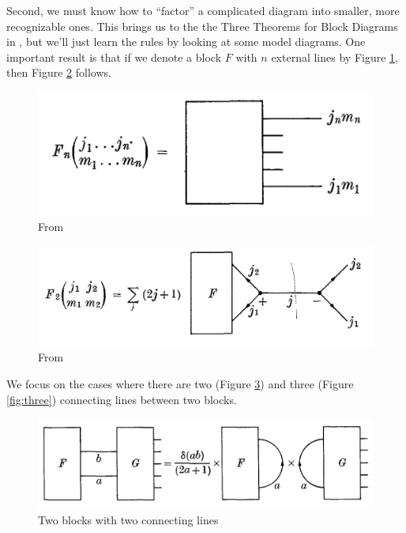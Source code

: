 \documentclass[11pt]{article}
\begin{document}
\begin{appendices}
Second, we must know how to ``factor'' a complicated diagram into smaller, more recognizable ones. This brings us to the the Three Theorems for Block Diagrams in \cite{angular_momentum}, but we'll just learn the rules by looking at some model diagrams. One important result is that if we denote a block $F$ with $n$ external lines by Figure \ref{fig:block0}, then Figure \ref{fig:block1} follows.
\begin{figure}[!htb]
	\centering
	\includegraphics[scale=0.7]{block0}
	\caption{From \cite{angular_momentum}}
	\label{fig:block0}
\end{figure}
\begin{figure}[!htb]
	\centering
	\includegraphics[scale=0.7]{block1}
	\caption{From \cite{angular_momentum}}
	\label{fig:block1}
\end{figure}



We focus on the cases where there are two (Figure \ref{fig:two}) and three (Figure \ref{fig:three}) connecting lines between two blocks. 
	\begin{figure}[!htb]
		\centering
		\includegraphics[scale=0.7]{blocks_two_lines}
		\caption{Two blocks with two connecting lines \cite{angular_momentum}}
		\label{fig:two}
	\end{figure}
	

\end{appendices}
\end{document}
